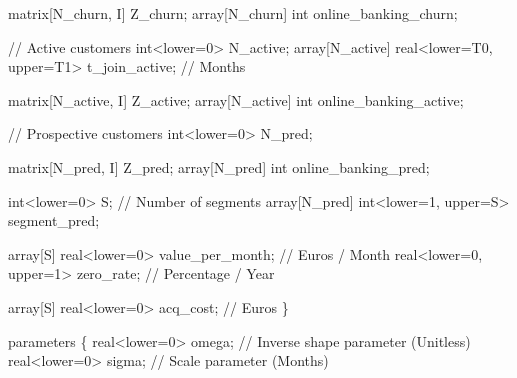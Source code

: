 \documentclass[
  letterpaper,
  DIV=11,
  numbers=noendperiod]{scrartcl}
\newenvironment{Shaded}{\begin{snugshade}}{\end{snugshade}}
\newcommand{\CommentTok}[1]{\textcolor[rgb]{0.37,0.37,0.37}{#1}}
\newcommand{\DataTypeTok}[1]{\textcolor[rgb]{0.68,0.00,0.00}{#1}}
\newcommand{\DecValTok}[1]{\textcolor[rgb]{0.68,0.00,0.00}{#1}}
\newcommand{\KeywordTok}[1]{\textcolor[rgb]{0.00,0.23,0.31}{#1}}
\newcommand{\NormalTok}[1]{\textcolor[rgb]{0.00,0.23,0.31}{#1}}
\begin{document}
\begin{codelisting}
\begin{Shaded}
\begin{Highlighting}[]
  \DataTypeTok{matrix}\NormalTok{[N\_churn, I] Z\_churn;}
  \DataTypeTok{array}\NormalTok{[N\_churn] }\DataTypeTok{int}\NormalTok{ online\_banking\_churn;}

  \CommentTok{// Active customers}
  \DataTypeTok{int}\NormalTok{\textless{}}\KeywordTok{lower}\NormalTok{=}\DecValTok{0}\NormalTok{\textgreater{} N\_active;}
  \DataTypeTok{array}\NormalTok{[N\_active] }\DataTypeTok{real}\NormalTok{\textless{}}\KeywordTok{lower}\NormalTok{=T0, }\KeywordTok{upper}\NormalTok{=T1\textgreater{} t\_join\_active; }\CommentTok{// Months}

  \DataTypeTok{matrix}\NormalTok{[N\_active, I] Z\_active;}
  \DataTypeTok{array}\NormalTok{[N\_active] }\DataTypeTok{int}\NormalTok{ online\_banking\_active;}

  \CommentTok{// Prospective customers}
  \DataTypeTok{int}\NormalTok{\textless{}}\KeywordTok{lower}\NormalTok{=}\DecValTok{0}\NormalTok{\textgreater{} N\_pred;}

  \DataTypeTok{matrix}\NormalTok{[N\_pred, I] Z\_pred;}
  \DataTypeTok{array}\NormalTok{[N\_pred] }\DataTypeTok{int}\NormalTok{ online\_banking\_pred;}

  \DataTypeTok{int}\NormalTok{\textless{}}\KeywordTok{lower}\NormalTok{=}\DecValTok{0}\NormalTok{\textgreater{} S; }\CommentTok{// Number of segments}
  \DataTypeTok{array}\NormalTok{[N\_pred] }\DataTypeTok{int}\NormalTok{\textless{}}\KeywordTok{lower}\NormalTok{=}\DecValTok{1}\NormalTok{, }\KeywordTok{upper}\NormalTok{=S\textgreater{} segment\_pred;}

  \DataTypeTok{array}\NormalTok{[S] }\DataTypeTok{real}\NormalTok{\textless{}}\KeywordTok{lower}\NormalTok{=}\DecValTok{0}\NormalTok{\textgreater{} value\_per\_month; }\CommentTok{// Euros / Month}
  \DataTypeTok{real}\NormalTok{\textless{}}\KeywordTok{lower}\NormalTok{=}\DecValTok{0}\NormalTok{, }\KeywordTok{upper}\NormalTok{=}\DecValTok{1}\NormalTok{\textgreater{} zero\_rate; }\CommentTok{// Percentage / Year}

  \DataTypeTok{array}\NormalTok{[S] }\DataTypeTok{real}\NormalTok{\textless{}}\KeywordTok{lower}\NormalTok{=}\DecValTok{0}\NormalTok{\textgreater{} acq\_cost;  }\CommentTok{// Euros}
\NormalTok{\}}

\KeywordTok{parameters}\NormalTok{ \{}
  \DataTypeTok{real}\NormalTok{\textless{}}\KeywordTok{lower}\NormalTok{=}\DecValTok{0}\NormalTok{\textgreater{} omega; }\CommentTok{// Inverse shape parameter (Unitless)}
  \DataTypeTok{real}\NormalTok{\textless{}}\KeywordTok{lower}\NormalTok{=}\DecValTok{0}\NormalTok{\textgreater{} sigma; }\CommentTok{// Scale parameter (Months)}


\end{Highlighting}
\end{Shaded}
\end{codelisting}
\end{document}
